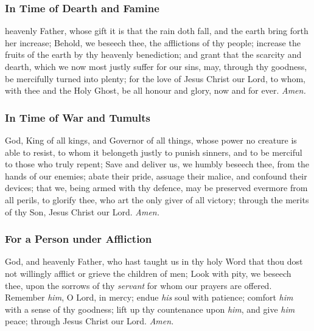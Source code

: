 \subsubsection{In Time of Dearth and Famine}
 heavenly Father, whose gift it is that the rain doth fall, and the earth bring forth her increase; Behold, we beseech thee, the afflictions of thy people; increase the fruits of the earth by thy heavenly benediction; and grant that the scarcity and dearth, which we now most justly suffer for our sins, may, through thy goodness, be mercifully turned into plenty; for the love of Jesus Christ our Lord, to whom, with thee and the Holy Ghost, be all honour and glory, now and for ever. \textit{Amen.}

\subsubsection{In Time of War and Tumults}
 God, King of all kings, and Governor of all things, whose power no creature is able to resist, to whom it belongeth justly to punish sinners, and to be merciful to those who truly repent; Save and deliver us, we humbly beseech thee, from the hands of our enemies; abate their pride, assuage their malice, and confound their devices; that we, being armed with thy defence, may be preserved evermore from all perils, to glorify thee, who art the only giver of all victory; through the merits of thy Son, Jesus Christ our Lord. \textit{Amen.}


\subsubsection{For a Person under Affliction}
 God, and heavenly Father, who hast taught us in thy holy Word that thou dost not willingly afflict or grieve the children of men; Look with pity, we beseech thee, upon the sorrows of thy \textit{servant} for whom our prayers are offered. Remember \textit{him}, O Lord, in mercy; endue \textit{his} soul with patience; comfort \textit{him} with a sense of thy goodness; lift up thy countenance upon \textit{him}, and give \textit{him} peace; through Jesus Christ our Lord. \textit{Amen.}

